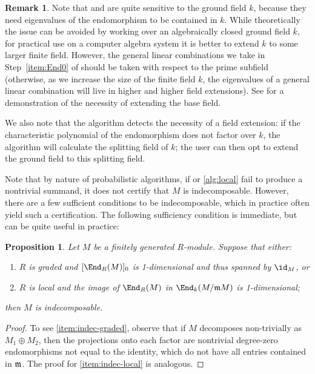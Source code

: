 \documentclass[12pt]{article}
\let\bar\overline
\theoremstyle{theorem}
\numberwithin{thm}{section}
\newtheorem{prop}[thm]{Proposition}
\theoremstyle{definition}
\newtheorem{rem}[thm]{Remark}
\begin{document}
\begin{rem}\label{rem:extension}
  Note that  and  are quite sensitive to the ground field $k$, because they need eigenvalues of the endomorphism to be contained in $k$. While theoretically the issue can be avoided by working over an algebraically closed ground field $\bar k$, for practical use on a computer algebra system it is better to extend $k$ to some larger finite field. However, the general linear combinations we take in Step~\ref{item:End0} of  should be taken with respect to the prime subfield (otherwise, as we increase the size of the finite field $k$, the eigenvalues of a general linear combination will live in higher and higher field extensions).
  See  for a demonstration of the necessity of extending the base field.

  We also note that the algorithm detects the necessity of a field extension: if the characteristic polynomial of the endomorphism does not factor over $k$, the algorithm will calculate the splitting field of $k$; the user can then opt to extend the ground field to this splitting field.
\end{rem}

Note that by nature of probabilistic algorithms, if  or \ref{alg:local} fail to produce a nontrivial summand, it does not certify that $M$ is indecomposable. However, there are a few sufficient conditions to be indecomposable, which in practice often  yield such a certification. The following sufficiency condition is immediate, but can be quite useful in practice:

\begin{prop}\label{prop:indecomposability}
  Let $M$ be a finitely generated $R$-module. Suppose that either:
  \begin{enumerate}
  \item\label{item:indec-graded} $R$ is graded and $[\End_R(M)]_0$ is 1-dimensional and thus spanned by $\id_M$, or
  \item\label{item:indec-local} $R$ is local and the image of $\End_R(M)$ in $\End_k(M/\m M)$ is 1-dimensional;
  \end{enumerate}
  then $M$ is indecomposable.
\end{prop}
\begin{proof}
  To see \eqref{item:indec-graded}, observe that if $M$ decomposes non-trivially as $M_1\oplus M_2$, then the projections onto each factor are nontrivial degree-zero endomorphisms not equal to the identity, which do not have all entries contained in $\mathfrak m$. The proof for \eqref{item:indec-local} is analogous.
\end{proof}
\end{document}
